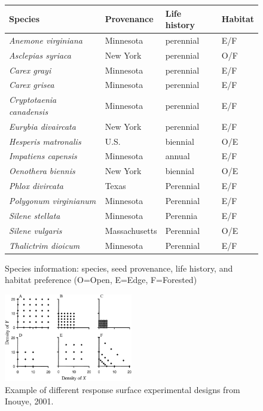 \documentclass{article}\usepackage[]{graphicx}\usepackage[]{color}
\begin{document}
\begin{figure}[here]
\begin{center}
\begin{tabular}{|l|l|l|l|}
\hline
\textbf{Species} & \textbf{Provenance} & \textbf{Life history} & \textbf{Habitat}\\
\hline
\textit{Anemone virginiana} & Minnesota & perennial & E/F\\
\hline
\textit{Asclepias syriaca} & New York & perennial & O/F \\
\hline
\textit{Carex grayi} & Minnesota & perennial & E/F\\
\hline
\textit{Carex grisea}& Minnesota & perennial & E/F\\
\hline
\textit{Cryptotaenia canadensis} & Minnesota & perennial & E/F\\
\hline
\textit{Eurybia divaircata} & New York & perennial & E/F\\
\hline
\textit{Hesperis matronalis} & U.S. & biennial & O/E\\
\hline
\textit{Impatiens capensis} & Minnesota & annual & E/F \\
\hline
\textit{Oenothera biennis} & New York & biennial & O/E \\
\hline
\textit{Phlox divircata} & Texas & Perennial & E/F\\
\hline
\textit{Polygonum virginianum} & Minnesota & Perennial & E/F\\
\hline
\textit{Silene stellata} & Minnesota & Perennia & E/F\\
\hline
\textit{Silene vulgaris} & Massachusetts & Perennial & O/E\\
\hline
\textit{Thalictrim dioicum} & Minnesota & Perennial & E/F\\
\hline
\end{tabular}
\caption{Species information: species, seed provenance, life history, and habitat preference (O=Open, E=Edge, F=Forested)}
\label{fig:Figure 6}
\end{center}
\end{figure}

\begin{figure}[here]
\begin{center}
\includegraphics[width=0.5\textwidth]{..//figures/response_surface.jpg}
\caption{Example of different response surface experimental designs from Inouye, 2001.}
\label{fig:Figure 7}
\end{center}
\end{figure}
\end{document}
